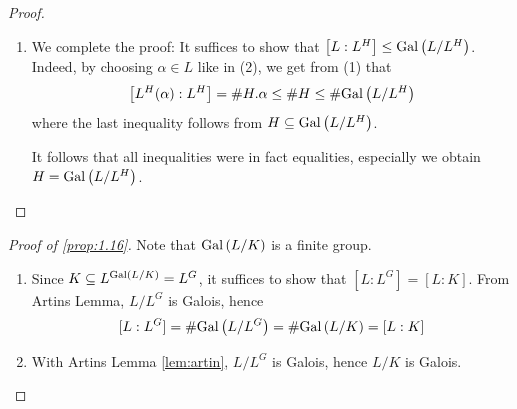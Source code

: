 \documentclass[twoside = false,	%
		headsepline,		%
		parskip = true,
		]{scrbook}						%
\begin{document}
\begin{proof}
\begin{enumerate}
                It suffices to show that $L\subseteq L^H(\alpha)$. For this fix an arbitrary $\beta\in L$ and consider the extension $L^H(\alpha,\beta)/L^H$. This extension is finite and separable (it is generated by separable elements). Now we can apply the primitive element theorem (Proposition 16(iii) in \cite{Cobra}), which gives $\gamma\in L$ with $L^H(\gamma)=L^H(\alpha,\beta)$. Because of the maximality property of $\alpha$, we have that $\gamma$ is already in $L^H(\alpha)$. The same must then be true for $\beta$. As a consequence, the extension $L/L^H$ is finite.
                \item We complete the proof: It suffices to show that $\left[ L:L^H\right]\leq\mathrm{Gal}\left( L/L^H\right)$. Indeed, by choosing $\alpha\in L$ like in (2), we get from (1) that
                 $$\left[ L^H(\alpha):L^H\right]=\#H.\alpha\leq \#H\leq \#\mathrm{Gal}\left( L/L^H\right)$$
                where the last inequality follows from $H\subseteq \mathrm{Gal}\left( L/L^H\right)$. 
                
                It follows that all inequalities were in fact equalities, especially we obtain $H=\mathrm{Gal}\left( L/L^H\right)$.
            \end{enumerate}
        \end{proof}
        \begin{proof}[Proof of \ref{prop:1.16}]
            Note that $\mathrm{Gal}\left( L/K\right)$ is a finite group.
            \begin{enumerate}
                \item ["$\Rightarrow$":] Since $K\subseteq L^{\mathrm{Gal}\left( L/K\right)}=L^G$, it suffices to show that $[L:L^G]=[L:K]$. From Artins Lemma, $L/L^G$ is Galois, hence $$[L:L^G]=\#\mathrm{Gal}\left( L/L^G\right)=\#\mathrm{Gal}\left( L/K\right)=[L:K]$$
                \item ["$\Leftarrow$":] With Artins Lemma \ref{lem:artin}, $L/L^G$ is Galois, hence $L/K$ is Galois.
            \end{enumerate}
        \end{proof}
\end{document}
